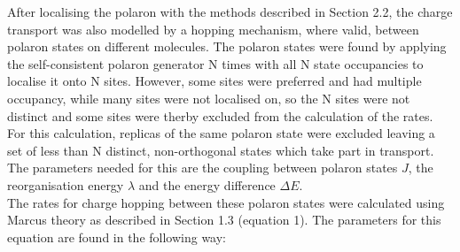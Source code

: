 \documentclass[a4paper,12pt]{article}
\begin{document}
\noindent After localising the polaron with the methods described in Section 2.2, the charge transport was also modelled by a hopping mechanism, where valid, between polaron states on different molecules. The polaron states were found by applying the self-consistent polaron generator N times with all N state occupancies to localise it onto N sites. However, some sites were preferred and had multiple occupancy, while many sites were not localised on, so the N sites were not distinct and some sites were therby excluded from the calculation of the rates. For this calculation, replicas of the same polaron state were excluded leaving a set of less than N distinct, non-orthogonal states which take part in transport. The parameters needed for this are the coupling between polaron states $J$, the reorganisation energy $\lambda$ and the energy difference $\Delta E$.\\

\noindent The rates for charge hopping between these polaron states were calculated using Marcus theory as described in Section 1.3 (equation 1). The parameters for this equation are found in the following way: 
\end{document}
